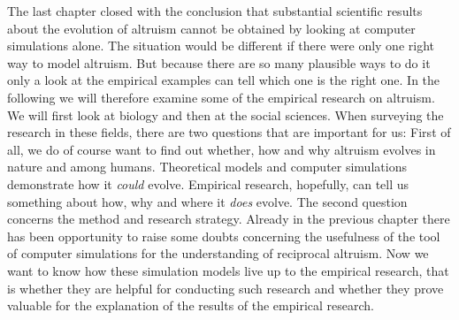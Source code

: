 
The last chapter closed with the conclusion that substantial scientific
results about the evolution of altruism cannot be obtained by looking at
computer simulations alone. The situation would be different if there were
only one right way to model altruism. But because there are so many plausible
ways to do it only a look at the empirical examples can tell which one is
the right one. In the following we will therefore examine some of the
empirical research on altruism. We will first look at biology and then at the
social sciences. When surveying the research in these fields, there are two
questions that are important for us: First of all, we do of course want to
find out whether, how and why altruism evolves in nature and among humans.
Theoretical models and computer simulations demonstrate how it {\em could}
evolve.  Empirical research, hopefully, can tell us something about how, why
and where it {\em does} evolve. The second question concerns the method and
research strategy. Already in the previous chapter there has been opportunity
to raise some doubts concerning the usefulness of the tool of computer
simulations for the understanding of reciprocal altruism. Now we want to know
how these simulation models live up to the empirical research, that is whether
they are helpful for conducting such research and whether they prove valuable
for the explanation of the results of the empirical research.


